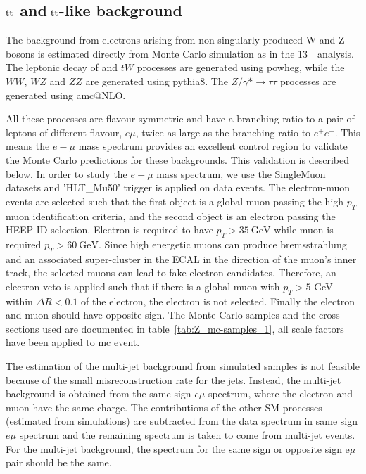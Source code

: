 
\subsection{\texorpdfstring{$\mathrm{t\bar{t}}$}{h1} and\texorpdfstring{$~\mathrm{t\bar{t}}$}{h2}-like background}
\label{Sec:emuSS}

The background from electrons arising from non-singularly produced W and Z bosons is estimated directly
from Monte Carlo simulation as in the 13~\TeV\ analysis.
The leptonic decay of \ttbar and $tW$ processes are generated using powheg, while the $WW$, $WZ$ and $ZZ$ are generated using pythia8.
The $Z/\gamma*\rightarrow \tau\tau$ processes are generated using amc@NLO.

All these processes are flavour-symmetric and have a branching ratio to a pair of leptons of different flavour,
$e\mu$, twice as large as the branching ratio to $e^{+}e^{-}$. This means the $e-\mu$ mass spectrum provides an
excellent control region to validate the Monte Carlo predictions for these backgrounds. This validation is described below.
In order to study the $e-\mu$ mass spectrum, we use the SingleMuon datasets and 'HLT\_Mu50' trigger is applied on data events.
The electron-muon events are selected such that the first object is a global muon passing the high $p_{T}$ muon identification criteria\cite{CMS-AN-2016-391},
and the second object is an electron passing the HEEP ID selection. Electron is required to have $p_{T}>35~\mathrm{GeV}$ while muon is required $p_{T}>60~\mathrm{GeV}$.
Since high energetic muons can produce bremsstrahlung and an associated super-cluster in the ECAL in the direction of the muon's
inner track, the selected muons can lead to fake electron candidates. Therefore, an electron veto is applied such that if there is
a global muon with $p_{T} > 5$ GeV within $\Delta R <0.1$ of the electron, the electron is not selected. Finally the electron and muon should have opposite sign.
The Monte Carlo samples and the cross-sections used are documented in table~\ref{tab:Z_mc-samples_1}, all scale factors have been applied to mc event.

The estimation of the multi-jet background from simulated samples is not feasible because of the small misreconstruction rate for the jets.
Instead, the multi-jet background is obtained from the same sign $e\mu$ spectrum, where the electron and muon have the same charge.
The contributions of the other SM processes (estimated from simulations) are subtracted from the data
spectrum in same sign $e\mu$ spectrum and the remaining spectrum is taken to come from multi-jet events. For the multi-jet background, the spectrum for the same sign or
opposite sign e$\mu$ pair should be the same.


